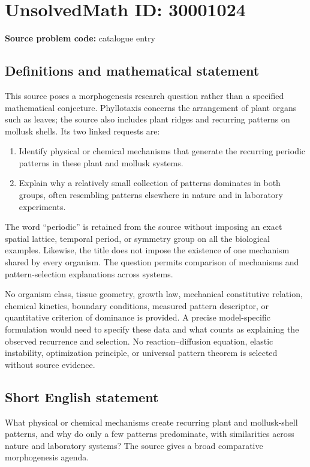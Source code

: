 \documentclass[11pt]{article}
\begin{document}
\section*{UnsolvedMath ID: 30001024}
\textbf{Source problem code:} catalogue entry
\subsection{Definitions and mathematical statement}
This source poses a morphogenesis research question rather than a specified mathematical conjecture. Phyllotaxis concerns the arrangement of plant organs such as leaves; the source also includes plant ridges and recurring patterns on mollusk shells. Its two linked requests are:
\begin{enumerate}
\item Identify physical or chemical mechanisms that generate the recurring periodic patterns in these plant and mollusk systems.
\item Explain why a relatively small collection of patterns dominates in both groups, often resembling patterns elsewhere in nature and in laboratory experiments.
\end{enumerate}
The word ``periodic'' is retained from the source without imposing an exact spatial lattice, temporal period, or symmetry group on all the biological examples. Likewise, the title does not impose the existence of one mechanism shared by every organism. The question permits comparison of mechanisms and pattern-selection explanations across systems.

No organism class, tissue geometry, growth law, mechanical constitutive relation, chemical kinetics, boundary conditions, measured pattern descriptor, or quantitative criterion of dominance is provided. A precise model-specific formulation would need to specify these data and what counts as explaining the observed recurrence and selection. No reaction--diffusion equation, elastic instability, optimization principle, or universal pattern theorem is selected without source evidence.
\subsection{Short English statement}
What physical or chemical mechanisms create recurring plant and mollusk-shell patterns, and why do only a few patterns predominate, with similarities across nature and laboratory systems? The source gives a broad comparative morphogenesis agenda.
\end{document}
